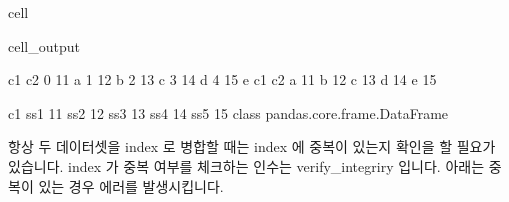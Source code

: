 \documentclass[letterpaper,10pt,english]{jupyterBook}
\begin{document}
\begin{sphinxuseclass}{cell}
\begin{sphinxVerbatimOutput}
\begin{sphinxuseclass}{cell_output}
\begin{sphinxVerbatim}[commandchars=\\\{\}]
   c1 c2
0  11  a
1  12  b
2  13  c
3  14  d
4  15  e
    c1
c2    
a   11
b   12
c   13
d   14
e   15


     c1
ss1  11
ss2  12
ss3  13
ss4  14
ss5  15 \PYGZlt{}class \PYGZsq{}pandas.core.frame.DataFrame\PYGZsq{}\PYGZgt{}
\end{sphinxVerbatim}

\end{sphinxuseclass}\end{sphinxVerbatimOutput}

\end{sphinxuseclass}
\sphinxAtStartPar
 항상 두 데이터셋을 index 로 병합할 때는 index 에 중복이 있는지 확인을 할 필요가 있습니다. index 가 중복 여부를 체크하는 인수는 verify\_integriry 입니다. 아래는 중복이 있는 경우 에러를 발생시킵니다.
\end{document}
